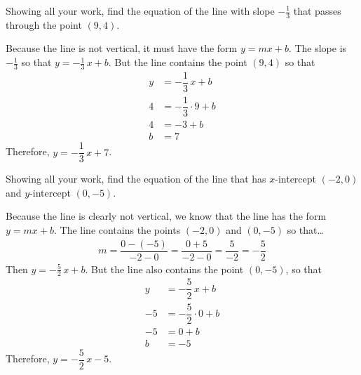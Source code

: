 \documentclass[11pt,letterpaper]{article}
\begin{document}
\newpage



 Showing all your work, find the equation of the line with slope $-\frac{1}{3}$ that passes through the point $(9, 4)$. \pspace

\sol Because the line is not vertical, it must have the form $y= mx + b$. The slope is $-\frac{1}{3}$ so that $y= -\frac{1}{3}\,x + b$. But the line contains the point $(9, 4)$ so that
	\[
	\begin{aligned}
	y&= -\dfrac{1}{3}\, x + b \\[0.3cm]
	4&= -\dfrac{1}{3} \cdot 9 + b \\[0.3cm]
	4&= -3 + b \\[0.3cm]
	b&= 7
	\end{aligned}
	\]
Therefore, $y= -\dfrac{1}{3}\,x + 7$. 



\newpage



 Showing all your work, find the equation of the line that has $x$-intercept $(-2, 0)$ and $y$-intercept $(0, -5)$. \pspace

\sol Because the line is clearly not vertical, we know that the line has the form $y= mx + b$. The line contains the points $(-2, 0)$ and $(0, -5)$ so that\dots \pspace
	\[
	\begin{aligned}
	m= \dfrac{0 - (-5)}{-2 - 0}= \dfrac{0 + 5}{-2 - 0}= \dfrac{5}{-2}= -\dfrac{5}{2}
	\end{aligned}
	\] \pspace
Then $y= -\frac{5}{2}\,x + b$. But the line also contains the point $(0, -5)$, so that
	\[
	\begin{aligned}
	y&= -\dfrac{5}{2}\, x + b \\[0.3cm]
	-5&= -\dfrac{5}{2} \cdot 0 + b \\[0.3cm]
	-5&= 0 + b \\[0.3cm]
	b&= -5
	\end{aligned}
	\]
Therefore, $y= -\dfrac{5}{2}\,x - 5$. 
\end{document}
